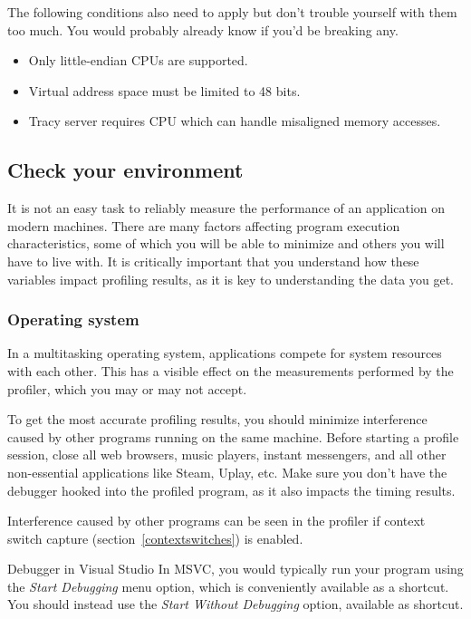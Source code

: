 \documentclass[hidelinks,titlepage,a4paper,twoside]{article}
\begin{document}
The following conditions also need to apply but don't trouble yourself with them too much. You would probably already know if you'd be breaking any.

\begin{itemize}
\item Only little-endian CPUs are supported.
\item Virtual address space must be limited to 48 bits.
\item Tracy server requires CPU which can handle misaligned memory accesses.
\end{itemize}

\subsection{Check your environment}

It is not an easy task to reliably measure the performance of an application on modern machines. There are many factors affecting program execution characteristics, some of which you will be able to minimize and others you will have to live with. It is critically important that you understand how these variables impact profiling results, as it is key to understanding the data you get.

\subsubsection{Operating system}
\label{checkenvironmentos}

In a multitasking operating system, applications compete for system resources with each other. This has a visible effect on the measurements performed by the profiler, which you may or may not accept.

To get the most accurate profiling results, you should minimize interference caused by other programs running on the same machine. Before starting a profile session, close all web browsers, music players, instant messengers, and all other non-essential applications like Steam, Uplay, etc. Make sure you don't have the debugger hooked into the profiled program, as it also impacts the timing results.

Interference caused by other programs can be seen in the profiler if context switch capture (section~\ref{contextswitches}) is enabled.

\begin{bclogo}[
noborder=true,
couleur=black!5,
logo=\bclampe
]{Debugger in Visual Studio}
In MSVC, you would typically run your program using the \emph{Start Debugging} menu option, which is conveniently available as a  shortcut. You should instead use the \emph{Start Without Debugging} option, available as  shortcut.
\end{bclogo}
\end{document}
